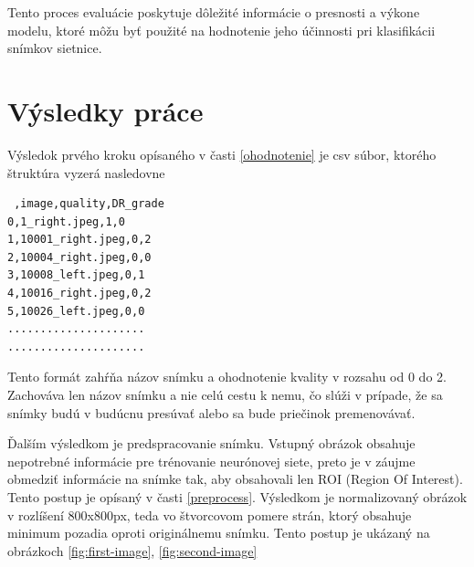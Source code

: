 \documentclass[a4paper, 11pt]{article}
\begin{document}
Tento proces evaluácie poskytuje dôležité informácie o presnosti a výkone modelu, ktoré môžu byť použité na hodnotenie jeho účinnosti pri klasifikácii snímkov sietnice.


\label{main}

\section{Výsledky práce}

Výsledok prvého kroku opísaného v časti \ref{ohodnotenie} je csv súbor, ktorého štruktúra vyzerá nasledovne
\begin{lstlisting}
 ,image,quality,DR_grade
0,1_right.jpeg,1,0
1,10001_right.jpeg,0,2
2,10004_right.jpeg,0,0
3,10008_left.jpeg,0,1
4,10016_right.jpeg,0,2
5,10026_left.jpeg,0,0
.....................
.....................
\end{lstlisting}

\vspace{20px}

\noindent Tento formát zahŕňa názov snímku a ohodnotenie kvality v rozsahu od 0 do 2.  Zachováva len názov snímku a nie celú cestu k nemu, čo slúži v prípade, že sa snímky budú v budúcnu presúvať alebo sa bude priečinok premenovávať.

\vspace{20px}

Ďalším výsledkom je predspracovanie snímku. Vstupný obrázok obsahuje nepotrebné informácie pre trénovanie neurónovej siete, preto je v záujme obmedziť informácie na snímke tak, aby obsahovali len ROI (Region Of Interest). Tento postup je opísaný v časti \ref{preprocess}. Výsledkom je normalizovaný obrázok v rozlíšení 800x800px, teda vo štvorcovom pomere strán, ktorý obsahuje minimum pozadia oproti originálnemu snímku. Tento postup je ukázaný na obrázkoch \ref{fig:first-image}, \ref{fig:second-image}
\end{document}
